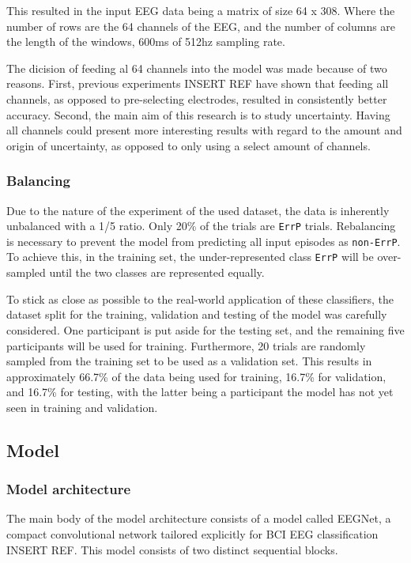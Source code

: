 This resulted in the input EEG data being a matrix of size 64 x 308. Where the number of rows are the 64 channels of the EEG, and the number of columns are the length of the windows, 600ms of 512hz sampling rate.

The dicision of feeding al 64 channels into the model was made because of two reasons. First, previous experiments {INSERT REF} have shown that feeding all channels, as opposed to pre-selecting electrodes, resulted in consistently better accuracy. Second, the main aim of this research is to study uncertainty. Having all channels could present more interesting results with regard to the amount and origin of uncertainty, as opposed to only using a select amount of channels.

\subsubsection{Balancing}

Due to the nature of the experiment of the used dataset, the data is inherently unbalanced with a 1/5 ratio. Only 20\% of the trials are \verb|ErrP| trials. Rebalancing is necessary to prevent the model from predicting all input episodes as \verb|non-ErrP|. To achieve this, in the training set, the under-represented class \verb|ErrP| will be over-sampled until the two classes are represented equally.

To stick as close as possible to the real-world application of these classifiers, the dataset split for the training, validation and testing of the model was carefully considered. One participant is put aside for the testing set, and the remaining five participants will be used for training. Furthermore, 20 trials are randomly sampled from the training set to be used as a validation set. This results in approximately 66.7\% of the data being used for training, 16.7\% for validation, and 16.7\% for testing, with the latter being a participant the model has not yet seen in training and validation. 


\subsection{Model}

\subsubsection{Model architecture}

The main body of the model architecture consists of a model called EEGNet, a compact convolutional network tailored explicitly for BCI EEG classification {INSERT REF}. This model consists of two distinct sequential blocks. 

